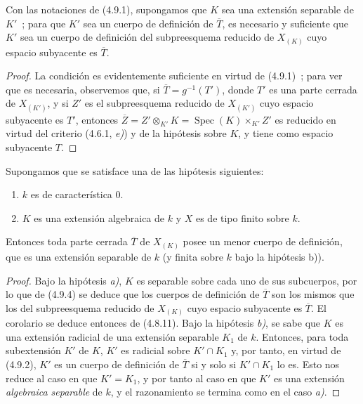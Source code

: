 \begin{proposition}[4.9.4]
\label{IV.2.4.9.4-fr}
Con las notaciones de \textup{(4.9.1)}, supongamos que $K$ sea una extensión separable
de $K'$~; para que $K'$ sea un cuerpo de definición de $\overline T$, es
necesario y suficiente que $K'$ sea un cuerpo de definición del subpreesquema
reducido de $X_{(K)}$ cuyo espacio subyacente es $\overline T$.
\end{proposition}

\begin{proof}
La condición es evidentemente suficiente en virtud de (4.9.1)~; para ver que
es necesaria, observemos que, si $\overline T=g^{-1}(T')$, donde $T'$ es una
parte cerrada de $X_{(K')}$, y si $Z'$ es el subpreesquema reducido de
$X_{(K')}$ cuyo espacio subyacente es $T'$, entonces
$\overline Z=Z'\otimes_{K'}K=\operatorname{Spec}(K)\times_{K'}Z'$ es reducido
en virtud del criterio (4.6.1, \emph{e)}) y de la hipótesis sobre $K$, y tiene como
espacio subyacente $T$.
\end{proof}

\begin{corollary}[4.9.5]
\label{IV.2.4.9.5-fr}
Supongamos que se satisface una de las hipótesis siguientes:
\begin{enumerate}
\item[\textup{a)}] $k$ es de característica $0$.
\item[\textup{b)}] $K$ es una extensión algebraica de $k$ y $X$ es de tipo finito sobre
$k$.
\end{enumerate}
Entonces toda parte cerrada $\overline T$ de $X_{(K)}$ posee un menor cuerpo
de definición, que es una extensión separable de $k$ (y finita sobre
$k$ bajo la hipótesis \textup{b))}.
\end{corollary}

\begin{proof}
Bajo la hipótesis \emph{a)}, $K$ es separable sobre cada uno de sus subcuerpos, por lo
que de (4.9.4) se deduce que los cuerpos de definición de $\overline T$ son los
mismos que los del subpreesquema reducido de $X_{(K)}$ cuyo espacio subyacente
es $\overline T$. El corolario se deduce entonces de (4.8.11). Bajo la
hipótesis \emph{b)}, se sabe que $K$ es una extensión radicial de una extensión
separable $K_1$ de $k$. Entonces, para toda subextensión $K'$ de $K$, $K'$ es
radicial sobre $K'\cap K_1$ y, por tanto, en virtud de (4.9.2), $K'$ es un
cuerpo de definición de $\overline T$ si y solo si $K'\cap K_1$ lo es. Esto
nos reduce al caso en que $K'=K_1$, y por tanto al caso en que $K'$ es una
extensión \emph{algebraica separable} de $k$, y el razonamiento se termina como en el
caso \emph{a)}.
\end{proof}

